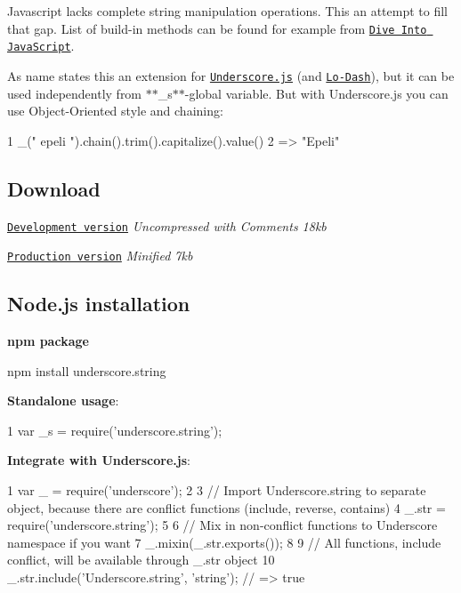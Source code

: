 Javascript lacks complete string manipulation operations. This an attempt to fill that gap. List of build-\/in methods can be found for example from \href{http://www.diveintojavascript.com/core-javascript-reference/the-string-object}{\tt Dive Into Java\+Script}.

As name states this an extension for \href{http://underscorejs.org/}{\tt Underscore.\+js} (and \href{http://lodash.com/}{\tt Lo-\/\+Dash}), but it can be used independently from $\ast$$\ast$\+\_\+s$\ast$$\ast$-\/global variable. But with Underscore.\+js you can use Object-\/\+Oriented style and chaining\+:


\begin{DoxyCode}
1 \_("   epeli  ").chain().trim().capitalize().value()
2 => "Epeli"
\end{DoxyCode}


\subsection*{Download}


\begin{DoxyItemize}
\item \href{https://raw.github.com/epeli/underscore.string/master/lib/underscore.string.js}{\tt Development version} {\itshape Uncompressed with Comments 18kb}
\item \href{https://github.com/epeli/underscore.string/raw/master/dist/underscore.string.min.js}{\tt Production version} {\itshape Minified 7kb}
\end{DoxyItemize}

\subsection*{Node.\+js installation}

{\bfseries npm package} \begin{DoxyVerb}npm install underscore.string
\end{DoxyVerb}


{\bfseries Standalone usage}\+:


\begin{DoxyCode}
1 var \_s = require('underscore.string');
\end{DoxyCode}


{\bfseries Integrate with Underscore.\+js}\+:


\begin{DoxyCode}
1 var \_  = require('underscore');
2 
3 // Import Underscore.string to separate object, because there are conflict functions (include, reverse,
       contains)
4 \_.str = require('underscore.string');
5 
6 // Mix in non-conflict functions to Underscore namespace if you want
7 \_.mixin(\_.str.exports());
8 
9 // All functions, include conflict, will be available through \_.str object
10 \_.str.include('Underscore.string', 'string'); // => true
\end{DoxyCode}


